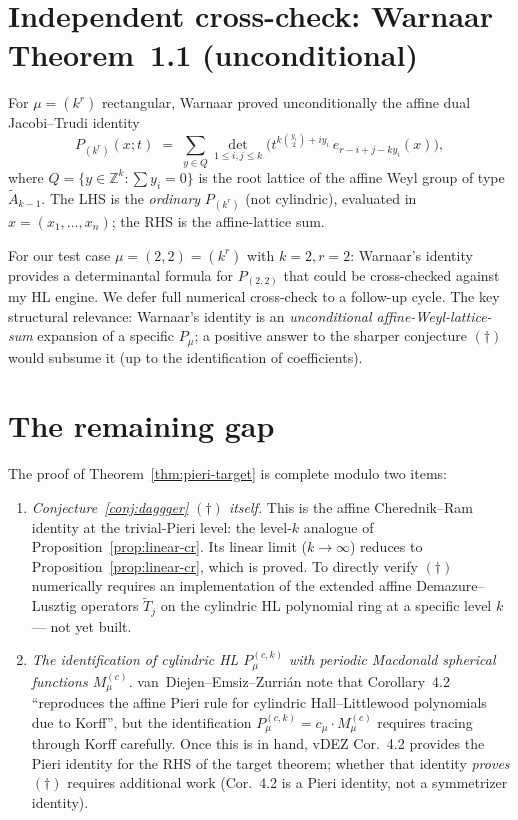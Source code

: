 \documentclass[11pt]{article}
\theoremstyle{definition}
\newcommand{\wt}[1]{\widetilde{#1}}
\newcommand{\Z}{\mathbb{Z}}
\newcommand{\dgg}{\dagger}
\begin{document}
\section{Independent cross-check: Warnaar Theorem~1.1 (unconditional)}
\label{sec:warnaar-crosscheck}

For $\mu = (k^r)$ rectangular, Warnaar \cite{Warnaar2026} proved unconditionally
the affine dual Jacobi--Trudi identity
\[
P_{(k^r)}(x;t) \;=\; \sum_{y \in Q} \det_{1 \le i, j \le k}\bigl(t^{k\binom{y_i}{2} + i y_i}\, e_{r - i + j - k y_i}(x)\bigr),
\]
where $Q = \{y \in \Z^k : \sum y_i = 0\}$ is the root lattice of the affine
Weyl group of type $\wt A_{k-1}$. The LHS is the \emph{ordinary} $P_{(k^r)}$
(not cylindric), evaluated in $x = (x_1, \ldots, x_n)$; the RHS is the
affine-lattice sum.

For our test case $\mu = (2, 2) = (k^r)$ with $k = 2, r = 2$: Warnaar's identity
provides a determinantal formula for $P_{(2,2)}$ that could be cross-checked
against my HL engine. We defer full numerical cross-check to a follow-up
cycle. The key structural relevance: Warnaar's identity is an
\emph{unconditional affine-Weyl-lattice-sum} expansion of a specific
$P_\mu$; a positive answer to the sharper conjecture $(\dgg)$ would
subsume it (up to the identification of coefficients).

\section{The remaining gap}
\label{sec:gap}

The proof of Theorem~\ref{thm:pieri-target} is complete modulo two items:

\begin{enumerate}[label=(\alph*)]
\item \emph{Conjecture~\ref{conj:daggger} $(\dgg)$ itself.} This is the affine
Cherednik--Ram identity at the trivial-Pieri level: the level-$k$ analogue of
Proposition~\ref{prop:linear-cr}. Its linear limit ($k \to \infty$) reduces
to Proposition~\ref{prop:linear-cr}, which is proved. To directly verify
$(\dgg)$ numerically requires an implementation of the extended affine
Demazure--Lusztig operators $\wt T_j$ on the cylindric HL polynomial ring
at a specific level $k$ — not yet built.

\item \emph{The identification of cylindric HL $P^{(c,k)}_\mu$ with periodic Macdonald
spherical functions $M^{(c)}_\mu$.} van~Diejen--Emsiz--Zurri\'an
\cite[Remark~4.3 sequel and preceding paragraph]{vDEZ2021} note that Corollary~4.2
``reproduces the affine Pieri rule for cylindric Hall--Littlewood polynomials
due to Korff'', but the identification $P^{(c,k)}_\mu = c_\mu \cdot M^{(c)}_\mu$
requires tracing through Korff \cite{Korff2013} carefully. Once this is
in hand, vDEZ Cor.~4.2 provides the Pieri identity for the RHS of the target
theorem; whether that identity \emph{proves} $(\dgg)$ requires additional
work (Cor.~4.2 is a Pieri identity, not a symmetrizer identity).
\end{enumerate}
\end{document}
